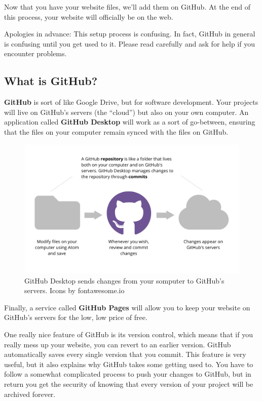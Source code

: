 \documentclass[]{book}
\theoremstyle{definition}
\theoremstyle{definition}
\theoremstyle{definition}
\theoremstyle{remark}
\begin{document}
Now that you have your website files, we'll add them on GitHub. At the
end of this process, your website will officially be on the web.

Apologies in advance: This setup process is confusing. In fact, GitHub
in general is confusing until you get used to it. Please read carefully
and ask for help if you encounter problems.

\hypertarget{what-is-github}{%
\subsection{What is GitHub?}\label{what-is-github}}

\textbf{GitHub} is sort of like Google Drive, but for software
development. Your projects will live on GitHub's servers (the ``cloud'')
but also on your own computer. An application called \textbf{GitHub
Desktop} will work as a sort of go-between, ensuring that the files on
your computer remain synced with the files on GitHub.

\begin{figure}
\centering
\includegraphics{github-diagram.png}
\caption{GitHub Desktop sends changes from your somputer to GitHub's
servers. Icons by fontawesome.io}
\end{figure}

Finally, a service called \textbf{GitHub Pages} will allow you to keep
your website on GitHub's servers for the low, low price of free.

One really nice feature of GitHub is its version control, which means
that if you really mess up your website, you can revert to an earlier
version. GitHub automatically saves every single version that you
commit. This feature is very useful, but it also explains why GitHub
takes some getting used to. You have to follow a somewhat complicated
process to push your changes to GitHub, but in return you get the
security of knowing that every version of your project will be archived
forever.
\end{document}
